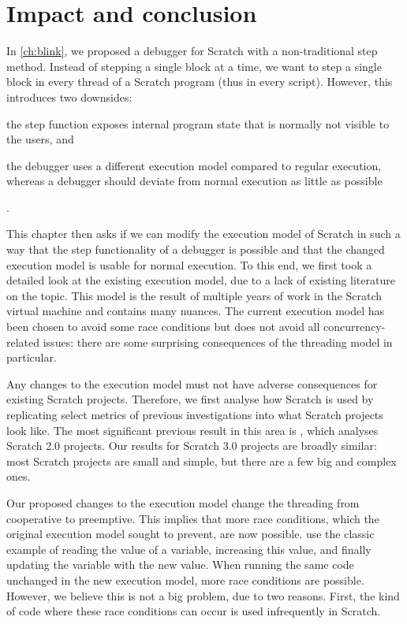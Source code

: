 \documentclass[../main]{subfiles}
\begin{document}
\section{Impact and conclusion}\label{sec:conclusion}

In \cref{ch:blink}, we proposed a debugger for Scratch with a non-traditional step method.
Instead of stepping a single block at a time, we want to step a single block in every thread of a Scratch program (thus in every script).
However, this introduces two downsides:
\begin{enumerate*}[label=\emph{\roman*})]
    \item the step function exposes internal program state that is normally not visible to the users, and
    \item the debugger uses a different execution model compared to regular execution, whereas a debugger should deviate from normal execution as little as possible
\end{enumerate*}.

This chapter then asks if we can modify the execution model of Scratch in such a way that the step functionality of a debugger is possible and that the changed execution model is usable for normal execution.
To this end, we first took a detailed look at the existing execution model, due to a lack of existing literature on the topic.
This model is the result of multiple years of work in the Scratch virtual machine and contains many nuances.
The current execution model has been chosen to avoid some race conditions but does not avoid all concurrency-related issues: there are some surprising consequences of the threading model in particular.

Any changes to the execution model must not have adverse consequences for existing Scratch projects.
Therefore, we first analyse how Scratch is used by replicating select metrics of previous investigations into what Scratch projects look like.
The most significant previous result in this area is \textcite{aivaloglouHowKidsCode2016}, which analyses Scratch 2.0 projects.
Our results for Scratch 3.0 projects are broadly similar: most Scratch projects are small and simple, but there are a few big and complex ones.

Our proposed changes to the execution model change the threading from cooperative to preemptive.
This implies that more race conditions, which the original execution model sought to prevent, are now possible.
\Textcite{maloneyScratchProgrammingLanguage2010} use the classic example of reading the value of a variable, increasing this value, and finally updating the variable with the new value.
When running the same code unchanged in the new execution model, more race conditions are possible.
However, we believe this is not a big problem, due to two reasons.
First, the kind of code where these race conditions can occur is used infrequently in Scratch.
\end{document}
